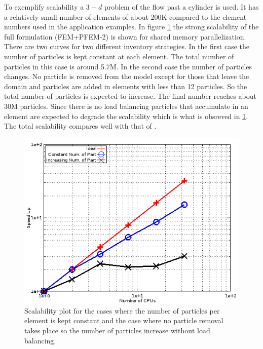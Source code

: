 To exemplify scalability a $3-d$ problem of the flow past a cylinder is used. It has a relatively small number of elements of about 200K compared to the element numbers used in the application examples. 
In figure \ref{fig:scalab} the strong scalability of the full formulation (FEM+PFEM-2) is shown for shared memory parallelization. There are two curves for two different inventory strategies. In the first case the number of particles is kept constant at each element. The total number of particles in this case is around 5.7M. In the second case the number of particles changes. No particle is removed from the model except for those that leave the domain and particles are added in elements with less than 12 particles. So the total number of particles is expected to increase. The final number reaches about 30M particles. Since there is no load balancing particles that accumulate in an element are expected to degrade the scalability which is what is obsreved in \ref{fig:scalab}. The total scalability compares well with that of \cite{gimenez:parallel}.

\begin{figure}[htp] 
\centering 
\includegraphics[scale=.6]{./imgs/scalability1.png}
\caption{Scalability plot for the cases where the number of particles per element is kept constant and the case where no particle removal takes place so the number of particles increase without load balancing.}
\label{fig:scalab}
\end{figure}


 
